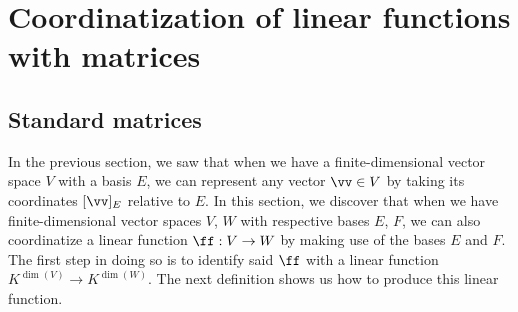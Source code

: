 \section{Coordinatization of linear functions with matrices}
\label{ch::lin_alg::section::coordinatization_of_linear functions}

\subsection*{Standard matrices}

In the previous section, we saw that when we have a finite-dimensional vector space $V$ with a basis $E$, we can represent any vector $\vv \in V$ by taking its coordinates $[\vv]_E$ relative to $E$. In this section, we discover that when we have finite-dimensional vector spaces $V$, $W$ with respective bases $E$, $F$, we can also coordinatize a linear function $\ff:V \rightarrow W$ by making use of the bases $E$ and $F$. The first step in doing so is to identify said $\ff$ with a linear function $K^{\dim(V)} \rightarrow K^{\dim(W)}$. The next definition shows us how to produce this linear function.

